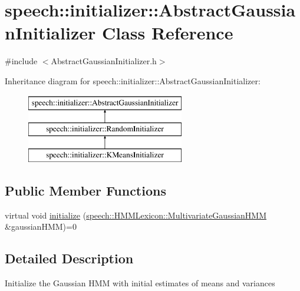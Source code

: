 \hypertarget{classspeech_1_1initializer_1_1AbstractGaussianInitializer}{\section{speech\+:\+:initializer\+:\+:Abstract\+Gaussian\+Initializer Class Reference}
\label{classspeech_1_1initializer_1_1AbstractGaussianInitializer}
}


{\ttfamily \#include $<$Abstract\+Gaussian\+Initializer.\+h$>$}

Inheritance diagram for speech\+:\+:initializer\+:\+:Abstract\+Gaussian\+Initializer\+:\begin{figure}[H]
\begin{center}
\leavevmode
\includegraphics[height=3.000000cm]{classspeech_1_1initializer_1_1AbstractGaussianInitializer}
\end{center}
\end{figure}
\subsection*{Public Member Functions}
\begin{DoxyCompactItemize}
\item 
virtual void \hyperlink{classspeech_1_1initializer_1_1AbstractGaussianInitializer_aa32dc879803a574a9bbd04b9f09f9f79}{initialize} (\hyperlink{classspeech_1_1HMMLexicon_1_1MultivariateGaussianHMM}{speech\+::\+H\+M\+M\+Lexicon\+::\+Multivariate\+Gaussian\+H\+M\+M} \&gaussian\+H\+M\+M)=0
\end{DoxyCompactItemize}


\subsection{Detailed Description}
Initialize the Gaussian H\+M\+M with initial estimates of means and variances 

